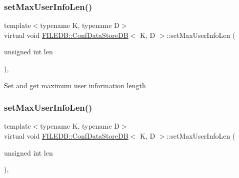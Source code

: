 \subsubsection{\texorpdfstring{setMaxUserInfoLen()}{setMaxUserInfoLen()}\hspace{0.1cm}{\footnotesize\ttfamily [2/3]}}
{\footnotesize\ttfamily template$<$typename K, typename D$>$ \\
virtual void \mbox{\hyperlink{classFILEDB_1_1ConfDataStoreDB}{F\+I\+L\+E\+D\+B\+::\+Conf\+Data\+Store\+DB}}$<$ K, D $>$\+::set\+Max\+User\+Info\+Len (\begin{DoxyParamCaption}\item[{unsigned int}]{len }\end{DoxyParamCaption})\hspace{0.3cm}{\ttfamily [inline]}, {\ttfamily [virtual]}}

Set and get maximum user information length \mbox{\label{classFILEDB_1_1ConfDataStoreDB_a02a2fcc79ba97c11b4ec1ec0321e5415}} 
\subsubsection{\texorpdfstring{setMaxUserInfoLen()}{setMaxUserInfoLen()}\hspace{0.1cm}{\footnotesize\ttfamily [3/3]}}
{\footnotesize\ttfamily template$<$typename K, typename D$>$ \\
virtual void \mbox{\hyperlink{classFILEDB_1_1ConfDataStoreDB}{F\+I\+L\+E\+D\+B\+::\+Conf\+Data\+Store\+DB}}$<$ K, D $>$\+::set\+Max\+User\+Info\+Len (\begin{DoxyParamCaption}\item[{unsigned int}]{len }\end{DoxyParamCaption})\hspace{0.3cm}{\ttfamily [inline]}, {\ttfamily [virtual]}}


